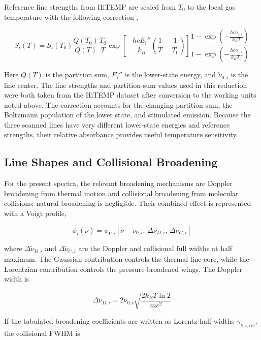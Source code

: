 \documentclass[12pt,letterpaper]{article}
\begin{document}
Reference line strengths from HiTEMP are scaled from $T_0$ to the local gas temperature with the following correction \cite{rothman2010hitemp,hitempco2019},

\begin{equation}
  S_i(T)=S_i(T_0)\frac{Q(T_0)}{Q(T)}\frac{T_0}{T}
  \exp\!\left[-\frac{hcE_i''}{k_B}\!\left(\frac{1}{T}-\frac{1}{T_0}\right)\right]
  \frac{1-\exp\!\left(-\frac{hc\tilde{\nu}_{0,i}}{k_B T}\right)}{1-\exp\!\left(-\frac{hc\tilde{\nu}_{0,i}}{k_B T_0}\right)}
\end{equation}

Here $Q(T)$ is the partition sum, $E_i''$ is the lower-state energy, and $\tilde{\nu}_{0,i}$ is the line center. The line strengths and partition-sum values used in this reduction were both taken from the HiTEMP dataset after conversion to the working units noted above. The correction accounts for the changing partition sum, the Boltzmann population of the lower state, and stimulated emission. Because the three scanned lines have very different lower-state energies and reference strengths, their relative absorbance provides useful temperature sensitivity.

\subsection*{Line Shapes and Collisional Broadening}

For the present spectra, the relevant broadening mechanisms are Doppler broadening from thermal motion and collisional broadening from molecular collisions; natural broadening is negligible. Their combined effect is represented with a Voigt profile,

\begin{equation}
  \phi_i(\tilde{\nu})
  =
  \phi_{V,i}\!\left[\tilde{\nu}-\tilde{\nu}_{0,i};\,\Delta\tilde{\nu}_{D,i},\,\Delta\tilde{\nu}_{C,i}\right]
\end{equation}

where $\Delta\tilde{\nu}_{D,i}$ and $\Delta\tilde{\nu}_{C,i}$ are the Doppler and collisional full widths at half maximum. The Gaussian contribution controls the thermal line core, while the Lorentzian contribution controls the pressure-broadened wings. The Doppler width is

\begin{equation}
  \Delta\tilde{\nu}_{D,i}
  =
  2\tilde{\nu}_{0,i}
  \sqrt{\frac{2k_B T \ln 2}{mc^2}}
\end{equation}

If the tabulated broadening coefficients are written as Lorentz half-widths $\gamma_{k,i,\mathrm{ref}}$, the collisional FWHM is
\end{document}
